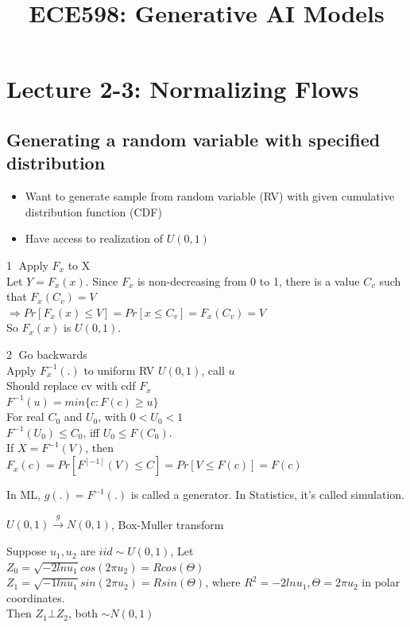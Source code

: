 \documentclass[12pt,a4paper]{article}
\title{ECE598: Generative AI Models}
\begin{document}
\maketitle

\section{Lecture 2-3: Normalizing Flows}
\subsection{Generating a random variable with specified distribution}

\begin{itemize}
\item Want to generate sample from random variable (RV) with given cumulative distribution function (CDF)
\item Have access to realization of $U(0,1)$
\end{itemize}

\textcircled{1} Apply $F_x$ to X\\
Let $Y=F_x(x)$. Since $F_x$ is non-decreasing from 0 to 1, there is a value $C_v$ such that $F_x(C_v)=V$\\ 
$\Rightarrow Pr[F_x(x)\le V]=Pr[x\le C_v]=F_x(C_v)=V$\\
So $F_x(x)$ is $U(0, 1)$.

\textcircled{2} Go backwards \\
Apply $F_x^{-1}(.)$ to uniform RV $U(0,1)$, call $u$\\
Should replace cv with cdf $F_x$\\
$F^{-1}(u)=min\{c:F(c)\geq u\}$\\
For real $C_0$ and $U_0$, with $0<U_0<1$\\
$F^{-1}(U_0)\le C_0$, iff $U_0\le F(C_0)$. \\
If $X=F^{-1}(V)$, then $F_x(c)=Pr[F^[-1](V)\le C]=Pr[V\le F(c)]=F(c)$

In ML, $g(.)=F^{-1}(.)$ is called a generator. In Statistics, it's called simulation.

\vspace{0.5cm}
$U(0,1)\overset{g}{\rightarrow}N(0,1)$, Box-Muller transform

Suppose $u_1, u_2$ are $iid\sim U(0,1)$, Let\\
$Z_0=\sqrt{-2ln u_1}cos(2\pi u_2)=Rcos(\Theta)$ \\
$Z_1=\sqrt{-1ln u_1}sin(2\pi u_2)=Rsin(\Theta)$, where $R^2=-2ln u_1, \Theta=2\pi u_2$ in polar coordinates. \\
Then $Z_1\bot Z_2$, both $\sim N(0,1)$
\end{document}
